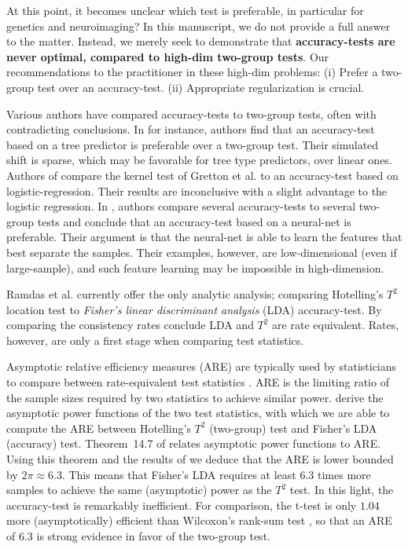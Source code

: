 \documentclass[]{bio}
\begin{document}
At this point, it becomes unclear which test is preferable, in particular for genetics and neuroimaging?
In this manuscript, we do not provide a full answer to the matter.
Instead, we merely seek to demonstrate that \textbf{accuracy-tests are never optimal, compared to high-dim two-group tests}.
Our recommendations to the practitioner in these high-dim problems:
(i) Prefer a two-group test over an accuracy-test. 
(ii) Appropriate regularization is crucial. 

Various authors have compared accuracy-tests to two-group tests, often with contradicting conclusions.
In \cite{yu2007two} for instance, authors find that an accuracy-test based on a tree predictor is preferable over a two-group test. 
Their simulated shift is sparse, which may be favorable for tree type predictors, over linear ones. 
Authors of \cite{olivetti2013kernel} compare the kernel test of Gretton et al. \cite{gretton_kernel_2012-1} to an accuracy-test based on logistic-regression.
Their results are inconclusive with a slight advantage to the logistic regression.
In \cite{lopez2016revisiting}, authors compare several accuracy-tests to several two-group tests and conclude that an accuracy-test based on a neural-net is preferable. 
Their argument is that the neural-net is able to learn the features that best separate the samples. 
Their examples, however, are low-dimensional (even if large-sample), and such feature learning may be impossible in high-dimension.

Ramdas et al. \cite{ramdas_classification_2016} currently offer the only analytic analysis; comparing Hotelling's $T^2$ location test to \emph{Fisher's linear discriminant analysis} (LDA) accuracy-test. 
By comparing the consistency rates \cite{ramdas_classification_2016} conclude LDA and $T^2$ are rate equivalent.
Rates, however, are only a first stage when comparing test statistics. 

Asymptotic relative efficiency measures (ARE) are typically used by statisticians to compare between rate-equivalent test statistics \citep{vaart_asymptotic_1998}.
ARE is the limiting ratio of the sample sizes required by two statistics to achieve similar power. 
\citet{ramdas_classification_2016} derive the asymptotic power functions of the two test statistics, with which we are able to compute the ARE between Hotelling's $T^2$ (two-group) test and Fisher's LDA (accuracy) test.
Theorem~14.7 of \cite{vaart_asymptotic_1998} relates asymptotic power functions to ARE.
Using this theorem and the results of \cite{ramdas_classification_2016} we deduce that the ARE is lower bounded by $2 \pi \approx 6.3$.
This means that Fisher's LDA requires at least $6.3$ times more samples to achieve the same (asymptotic) power as the $T^2$ test. 
In this light, the accuracy-test is remarkably inefficient.  
For comparison, the t-test is only $1.04$ more (asymptotically) efficient than Wilcoxon's rank-sum test \citep{lehmann_parametric_2009}, so that an ARE of $6.3$ is strong evidence in favor of the two-group test. 
\end{document}

